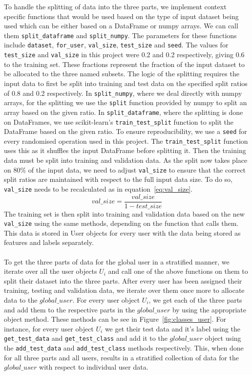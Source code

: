 \documentclass[12pt]{article}
\begin{document}
To handle the splitting of data into the three parts, we implement context specific functions that would be used based on the type of input dataset being used which can be either based on a DataFrame or numpy arrays. We can call them \texttt{split\_dataframe} and \texttt{split\_numpy}. The parameters for these functions include \texttt{dataset}, \texttt{for\_user}, \texttt{val\_size}, \texttt{test\_size} and \texttt{seed}. The values for \texttt{test\_size} and \texttt{val\_size} in this project were 0.2 and 0.2 respectively, giving 0.6 to the training set. These fractions represent the fraction of the input dataset to be allocated to the three named subsets. The logic of the splitting requires the input data to first be split into training and test data on the specified split ratios of 0.8 and 0.2 respectively. In \texttt{split\_numpy}, where we deal directly with numpy arrays, for the splitting we use the \texttt{split} function provided by numpy to split an array based on the given ratio. In \texttt{split\_dataframe}, where the splitting is done on DataFrames, we use scikit-learn's \texttt{train\_test\_split} function to split the DataFrame based on the given ratio. To ensure reproducibility, we use a \texttt{seed} for every randomised operation used in this project. The \texttt{train\_test\_split} function uses this as it shuffles the input DataFrame before splitting it. Then the training data must be split into training and validation data. As the split now takes place on 80\% of the input data, we need to adjust \texttt{val\_size} to ensure that the correct split ratios are maintained with respect to the full input data size. To do so, \texttt{val\_size} needs to be recalculated as in equation~\ref{eq:val_size}. 
\begin{equation}\label{eq:val_size}
	val\_size = \frac{val\_size}{1-test\_size}
\end{equation}
The training set is then split into training and validation data based on the new \texttt{val\_size} using the same methods, depending on the function that calls them. This data is stored in User objects for every user with the data being stored as features and labels separately. 
\\\\
To get the three parts of data for the global user in a stratified manner, we iterate over all the user objects $U_i$ and call one of the above functions on them to split their dataset into the three parts. After every user has been assigned their training, testing and validation data, we iterate over them once more to allocate data to the $global\_user$. For every user object $U_i$, we get each of the three parts and add them to the respective parts in the $global\_user$ by using the appropriate object method. These methods can be see in Figure~\ref{fig:classes_user}. For instance, for every user object $U_i$ we get their test data and it's label using the \texttt{get\_test\_data} and \texttt{get\_test\_class} and add it to the $global\_user$ object using the \texttt{add\_test\_data} and \texttt{add\_test\_class} methods respectively. This, when done for all three parts and all users, results in a stratified collection of data for the $global\_user$ with respect to individual user data.
\end{document}
